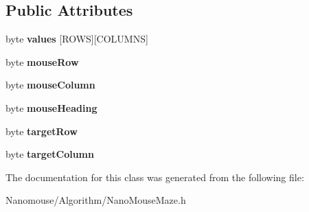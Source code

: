 \subsection*{Public Attributes}
\begin{DoxyCompactItemize}
\item 
\hypertarget{class_nano_mouse_maze_a20aa486d3466b42ed7238ada297a3f59}{}byte {\bfseries values} \mbox{[}R\+O\+W\+S\mbox{]}\mbox{[}C\+O\+L\+U\+M\+N\+S\mbox{]}\label{class_nano_mouse_maze_a20aa486d3466b42ed7238ada297a3f59}

\item 
\hypertarget{class_nano_mouse_maze_abfb9149cedd6f5ced495b5b1d68af63d}{}byte {\bfseries mouse\+Row}\label{class_nano_mouse_maze_abfb9149cedd6f5ced495b5b1d68af63d}

\item 
\hypertarget{class_nano_mouse_maze_a8711c442ba4416741c3cf81a2dd23a15}{}byte {\bfseries mouse\+Column}\label{class_nano_mouse_maze_a8711c442ba4416741c3cf81a2dd23a15}

\item 
\hypertarget{class_nano_mouse_maze_a9bc5de8a4d47b5803d708ed3bfff963f}{}byte {\bfseries mouse\+Heading}\label{class_nano_mouse_maze_a9bc5de8a4d47b5803d708ed3bfff963f}

\item 
\hypertarget{class_nano_mouse_maze_a3e3e5882c32134f7491271a364216d3c}{}byte {\bfseries target\+Row}\label{class_nano_mouse_maze_a3e3e5882c32134f7491271a364216d3c}

\item 
\hypertarget{class_nano_mouse_maze_aad1be11916d3be65937b1c8892556210}{}byte {\bfseries target\+Column}\label{class_nano_mouse_maze_aad1be11916d3be65937b1c8892556210}

\end{DoxyCompactItemize}


The documentation for this class was generated from the following file\+:\begin{DoxyCompactItemize}
\item 
Nanomouse/\+Algorithm/Nano\+Mouse\+Maze.\+h\end{DoxyCompactItemize}
